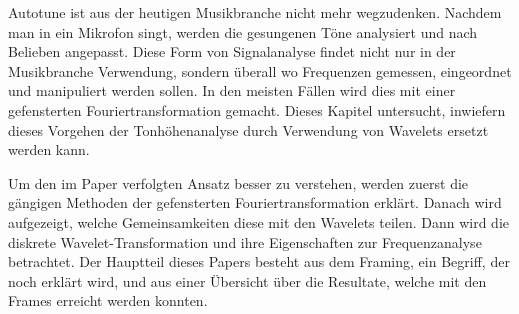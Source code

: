 Autotune ist aus der heutigen Musikbranche nicht mehr wegzudenken.
Nachdem man in ein Mikrofon singt, werden die gesungenen Töne
analysiert und nach Belieben angepasst.
Diese Form von Signalanalyse findet nicht nur in der Musikbranche
Verwendung, sondern überall wo Frequenzen gemessen, eingeordnet und
manipuliert werden sollen.
In den meisten Fällen wird dies mit einer gefensterten
Fouriertransformation gemacht.
Dieses Kapitel untersucht, inwiefern dieses Vorgehen der Tonhöhenanalyse
durch Verwendung von Wavelets ersetzt werden kann.

Um den im Paper verfolgten Ansatz besser zu verstehen, werden zuerst
die gängigen Methoden der gefensterten Fouriertransformation erklärt.
Danach wird aufgezeigt, welche Gemeinsamkeiten diese mit den Wavelets
teilen.
Dann wird die diskrete Wavelet-Transformation und ihre Eigenschaften
zur Frequenzanalyse betrachtet.
Der Hauptteil dieses Papers besteht aus dem Framing, ein Begriff,
der noch erklärt wird, und aus einer Übersicht über die Resultate,
welche mit den Frames erreicht werden konnten.
